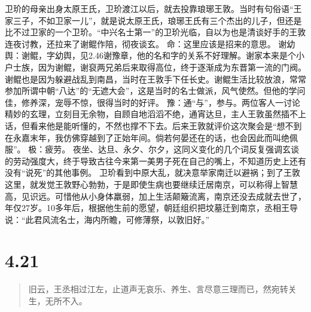 \documentclass[]{book}
\begin{document}
卫玠的母亲出身太原王氏，卫玠渡江以后，就去投靠琅琊王敦。当时有句俗语``王家三子，不如卫家一儿''，就是说太原王氏，琅琊王氏有三个杰出的儿子，但还是比不过卫家的一个卫玠。``中兴名士第一''的卫玠光临，自以为也是清谈好手的王敦连夜讨教，还拉来了谢鲲作陪，彻夜谈玄。
命：这里应该是招来的意思。
谢幼舆：谢鲲，字幼舆，见2.46谢豫章，他的名和字的关系不好理解。谢家本来是个小户士族，因为谢鲲，谢裒两兄弟后来取得高位，终于逐渐成为东晋第一流的门阀。谢鲲也是因为躲避战乱到南昌，当时在王敦手下任长史。谢鲲生活比较放浪，常常参加所谓中朝``八达''的``无遮大会''，这是当时的名士做派，风气使然。但他的学问佳，修养深，宠辱不惊，很得当时的好评。
豫：通``与''，参与。两位客人一讨论精妙的玄理，立刻目无余物，自顾自地滔滔不绝，通宵达旦，主人王敦虽然插不上话，但看来他是能听懂的，不然也撑不下去。后来王敦就评价这次聚会是``想不到在永嘉末年，我仿佛穿越到了正始年间。倘若何晏还在的话，也会因此而叫绝佩服''。
极：疲劳。
夜坐、达旦、永夕、尔夕，这同义变化的几个词反复强调玄谈的劳动强度大，终于导致古往今来第一美男子死在自己的嘴上，不知道历史上还有没有``说死''的其他事例。
卫玠看到中原大乱，就决意举家南迁以避祸；到了王敦这里，就发觉王敦野心勃勃，于是即使生病也要继续迁居南京，可以称得上智慧高，见识远。可惜他从小身体羸弱，加上生活颠簸流离，南京还没去成就去世了，年仅27岁。10多年后，根据他生前的愿望，朝廷组织把坟墓迁到南京，丞相王导说：``此君风流名士，海内所瞻，可修薄祭，以敦旧好。''

\section{4.21}\label{section-200}

\begin{quote}
旧云，王丞相过江左，止道声无哀乐、养生、言尽意三理而已，然宛转关生，无所不入。
\end{quote}
\end{document}
